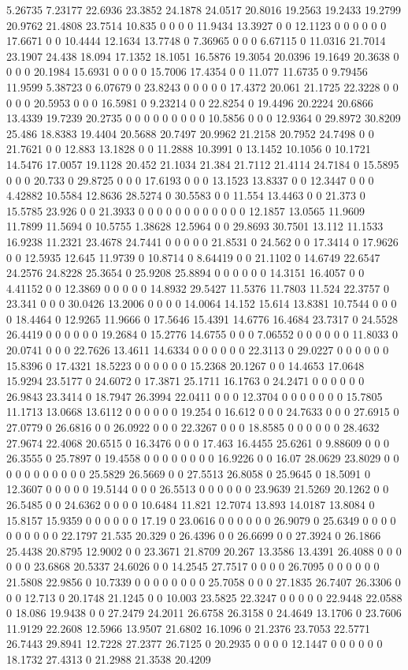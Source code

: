 5.26735 7.23177 22.6936 23.3852 24.1878 24.0517 20.8016 19.2563 19.2433 19.2799 20.9762 21.4808 23.7514 10.835 0 0 0 0 11.9434 13.3927 0 0 12.1123 0 0 0 0 0 0 17.6671 0 0 10.4444 12.1634 13.7748 0 7.36965 0 0 0 6.67115 0 11.0316 21.7014 23.1907 24.438 18.094 17.1352 18.1051 16.5876 19.3054 20.0396 19.1649 20.3638 0 0 0 0 20.1984 15.6931 0 0 0 0 15.7006 17.4354 0 0 11.077 11.6735 0 9.79456 11.9599 5.38723 0 6.07679 0 23.8243 0 0 0 0 0 17.4372 20.061 21.1725 22.3228 0 0 0 0 0 20.5953 0 0 0 16.5981 0 9.23214 0 0 22.8254 0 19.4496 20.2224 20.6866 13.4339 19.7239 20.2735 0 0 0 0 0 0 0 0 0 10.5856 0 0 0 12.9364 0 29.8972 30.8209 25.486 18.8383 19.4404 20.5688 20.7497 20.9962 21.2158 20.7952 24.7498 0 0 21.7621 0 0 12.883 13.1828 0 0 11.2888 10.3991 0 13.1452 10.1056 0 10.1721 14.5476 17.0057 19.1128 20.452 21.1034 21.384 21.7112 21.4114 24.7184 0 15.5895 0 0 0 20.733 0 29.8725 0 0 0 17.6193 0 0 0 13.1523 13.8337 0 0 12.3447 0 0 0 4.42882 10.5584 12.8636 28.5274 0 30.5583 0 0 11.554 13.4463 0 0 21.373 0 15.5785 23.926 0 0 21.3933 0 0 0 0 0 0 0 0 0 0 0 0 12.1857 13.0565 11.9609 11.7899 11.5694 0 10.5755 1.38628 12.5964 0 0 29.8693 30.7501 13.112 11.1533 16.9238 11.2321 23.4678 24.7441 0 0 0 0 0 21.8531 0 24.562 0 0 17.3414 0 17.9626 0 0 12.5935 12.645 11.9739 0 10.8714 0 8.64419 0 0 21.1102 0 14.6749 22.6547 24.2576 24.8228 25.3654 0 25.9208 25.8894 0 0 0 0 0 0 14.3151 16.4057 0 0 4.41152 0 0 12.3869 0 0 0 0 0 14.8932 29.5427 11.5376 11.7803 11.524 22.3757 0 23.341 0 0 0 30.0426 13.2006 0 0 0 0 14.0064 14.152 15.614 13.8381 10.7544 0 0 0 0 18.4464 0 12.9265 11.9666 0 17.5646 15.4391 14.6776 16.4684 23.7317 0 24.5528 26.4419 0 0 0 0 0 0 19.2684 0 15.2776 14.6755 0 0 0 7.06552 0 0 0 0 0 0 11.8033 0 20.0741 0 0 0 22.7626 13.4611 14.6334 0 0 0 0 0 0 22.3113 0 29.0227 0 0 0 0 0 0 15.8396 0 17.4321 18.5223 0 0 0 0 0 0 15.2368 20.1267 0 0 14.4653 17.0648 15.9294 23.5177 0 24.6072 0 17.3871 25.1711 16.1763 0 24.2471 0 0 0 0 0 0 26.9843 23.3414 0 18.7947 26.3994 22.0411 0 0 0 12.3704 0 0 0 0 0 0 0 15.7805 11.1713 13.0668 13.6112 0 0 0 0 0 0 19.254 0 16.612 0 0 0 24.7633 0 0 0 27.6915 0 27.0779 0 26.6816 0 0 26.0922 0 0 0 22.3267 0 0 0 18.8585 0 0 0 0 0 0 28.4632 27.9674 22.4068 20.6515 0 16.3476 0 0 0 17.463 16.4455 25.6261 0 9.88609 0 0 0 26.3555 0 25.7897 0 19.4558 0 0 0 0 0 0 0 0 16.9226 0 0 16.07 28.0629 23.8029 0 0 0 0 0 0 0 0 0 0 0 25.5829 26.5669 0 0 27.5513 26.8058 0 25.9645 0 18.5091 0 12.3607 0 0 0 0 0 19.5144 0 0 0 26.5513 0 0 0 0 0 0 23.9639 21.5269 20.1262 0 0 26.5485 0 0 24.6362 0 0 0 0 10.6484 11.821 12.7074 13.893 14.0187 13.8084 0 15.8157 15.9359 0 0 0 0 0 0 17.19 0 23.0616 0 0 0 0 0 0 26.9079 0 25.6349 0 0 0 0 0 0 0 0 0 0 22.1797 21.535 20.329 0 26.4396 0 0 26.6699 0 0 27.3924 0 26.1866 25.4438 20.8795 12.9002 0 0 23.3671 21.8709 20.267 13.3586 13.4391 26.4088 0 0 0 0 0 0 23.6868 20.5337 24.6026 0 0 14.2545 27.7517 0 0 0 0 26.7095 0 0 0 0 0 0 21.5808 22.9856 0 10.7339 0 0 0 0 0 0 0 0 25.7058 0 0 0 27.1835 26.7407 26.3306 0 0 0 12.713 0 20.1748 21.1245 0 0 10.003 23.5825 22.3247 0 0 0 0 0 22.9448 22.0588 0 18.086 19.9438 0 0 27.2479 24.2011 26.6758 26.3158 0 24.4649 13.1706 0 23.7606 11.9129 22.2608 12.5966 13.9507 21.6802 16.1096 0 21.2376 23.7053 22.5771 26.7443 29.8941 12.7228 27.2377 26.7125 0 20.2935 0 0 0 0 12.1447 0 0 0 0 0 0 18.1732 27.4313 0 21.2988 21.3538 20.4209 